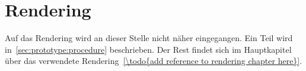 
\section{Rendering}
\label{sec:prototype:rendering}

Auf das Rendering wird an dieser Stelle nicht näher eingegangen. Ein Teil wird
in~\ref{sec:prototype:procedure} beschrieben. Der Rest findet sich im
Hauptkapitel über das verwendete Rendering~\ref{\todo{add reference to
        rendering chapter here}}.
